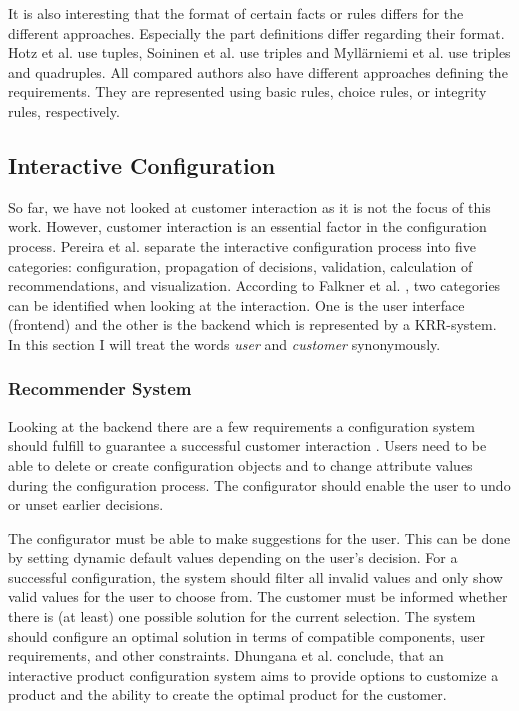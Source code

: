 It is also interesting that the format of certain facts or rules differs for the different approaches. Especially the part definitions differ regarding their format. Hotz et al. \cite{hofestrybawo14a} use tuples, Soininen et al. \cite{sonitisu01a} use triples and Myllärniemi et al. \cite{mytirafe14a} use triples and quadruples. All compared authors also have different approaches defining the requirements. They are represented using basic rules, choice rules, or integrity rules, respectively. 

\subsection{Interactive Configuration}

So far, we have not looked at customer interaction as it is not the focus of this work. However, customer interaction is an essential factor in the configuration process. Pereira et al. \cite{pemakrspsa17} separate the interactive configuration process into five categories: configuration, propagation of decisions, validation, calculation of recommendations, and visualization. According to Falkner et al. \cite{fahakrscscta20a}, two categories can be identified when looking at the interaction. One is the user interface (frontend) and the other is the backend which is represented by a KRR-system. In this section I will treat the words \textit{user} and \textit{customer} synonymously.

\subsubsection{Recommender System}
Looking at the backend there are a few requirements a configuration system should fulfill to guarantee a successful customer interaction \cite{fahakrscscta20a}. Users need to be able to delete or create configuration objects and to change attribute values during the configuration process. The configurator should enable the user to undo or unset earlier decisions. \newline

The configurator must be able to make suggestions for the user. This can be done by setting dynamic default values depending on the user's decision. For a successful configuration, the system should filter all invalid values and only show valid values for the user to choose from. The customer must be informed whether there is (at least) one possible solution for the current selection. The system should configure an optimal solution in terms of compatible components, user requirements, and other constraints. Dhungana et al. \cite{dhfahata17a} conclude, that an interactive product configuration system aims to provide options to customize a product and the ability to create the optimal product for the customer. 

